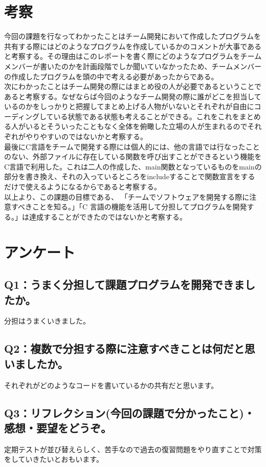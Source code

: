 \documentclass[12pt,a4j]{jarticle}
\begin{document}
\section{考察}
今回の課題を行なってわかったことはチーム開発において作成したプログラムを共有する際にはどのようなプログラムを作成しているかのコメントが大事であると考察する。その理由はこのレポートを書く際にどのようなプログラムをチームメンバーが書いたのかを計画段階でしか聞いていなかったため、チームメンバーの作成したプログラムを頭の中で考える必要があったからである。\\次にわかったことはチーム開発の際にはまとめ役の人が必要であるということであると考察する。なぜならば今回のようなチーム開発の際に誰がどこを担当しているのかをしっかりと把握してまとめ上げる人物がいないとそれぞれが自由にコーディングしている状態である状態も考えることができる。これをこれをまとめる人がいるとそういったこともなく全体を俯瞰した立場の人が生まれるのでそれぞれがやりやすいのではないかと考察する。\\最後にC言語をチームで開発する際には個人的には、他の言語では行なったことのない、外部ファイルに存在している関数を呼び出すことができるという機能をC言語で利用した。これは二人の作成した、main関数となっているものをmainの部分を書き換え、それの入っているところをincludeすることで関数宣言をするだけで使えるようになるからであると考察する。\\以上より、この課題の目標である、 「チームでソフトウェアを開発する際に注意すべきことを知る。」「C 言語の機能を活用して分担してプログラムを開発する。」は達成することができたのではないかと考察する。


\section{アンケート}

\subsection{Q1：うまく分担して課題プログラムを開発できましたか。}
分担はうまくいきました。
\subsection{Q2：複数で分担する際に注意すべきことは何だと思いましたか。}
それぞれがどのようなコードを書いているかの共有だと思います。
\subsection{Q3：リフレクション(今回の課題で分かったこと)・感想・要望をどうぞ。}
定期テストが並び替えらしく、苦手なので過去の復習問題をやり直すことで対策をしていきたいとおもいます。
\end{document}
